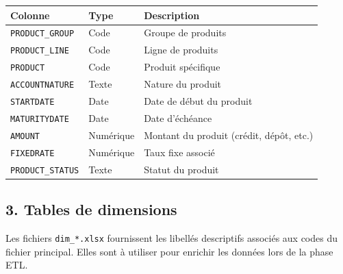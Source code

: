\documentclass[11pt,a4paper]{article}
\begin{document}
{\def\LTcaptype{none} %
\begin{longtable}[]{@{}lll@{}}
\toprule\noalign{}
Colonne & Type & Description \\
\midrule\noalign{}
\endhead
\bottomrule\noalign{}
\endlastfoot
\texttt{PRODUCT\_GROUP} & Code & Groupe de produits \\
\texttt{PRODUCT\_LINE} & Code & Ligne de produits \\
\texttt{PRODUCT} & Code & Produit spécifique \\
\texttt{ACCOUNTNATURE} & Texte & Nature du produit \\
\texttt{STARTDATE} & Date & Date de début du produit \\
\texttt{MATURITYDATE} & Date & Date d'échéance \\
\texttt{AMOUNT} & Numérique & Montant du produit (crédit, dépôt,
etc.) \\
\texttt{FIXEDRATE} & Numérique & Taux fixe associé \\
\texttt{PRODUCT\_STATUS} & Texte & Statut du produit \\
\end{longtable}
}

\subsection{3. Tables de dimensions}\label{tables-de-dimensions}

Les fichiers \texttt{dim\_*.xlsx} fournissent les libellés descriptifs
associés aux codes du fichier principal. Elles sont à utiliser pour
enrichir les données lors de la phase ETL.
\end{document}
